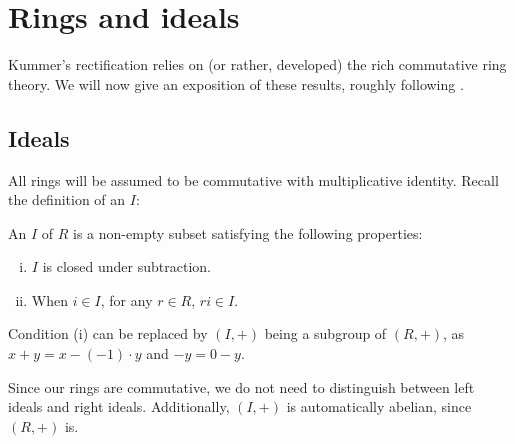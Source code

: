 \chapter{Rings and ideals}\label{sec-rings}
Kummer's rectification relies on (or rather, developed) the rich commutative ring theory. We will now give an exposition of these results, roughly following \cite{Wright}.
\section{Ideals}
All rings will be assumed to be commutative with multiplicative identity. Recall the definition of an  $I$:
\begin{definition}
An  $I$ of $R$ is a non-empty subset satisfying the following properties:
\begin{enumerate}[(i)]
    \item $I$ is closed under subtraction.
    \item When $i\in I$, for any $r\in R$, $ri\in I$.
\end{enumerate}
\end{definition}

\begin{remark}
Condition (i) can be replaced by $(I,+)$ being a subgroup of $(R,+)$, as $x+y=x-(-1)\cdot y$ and $-y=0-y$.
\end{remark}

\begin{remark}
Since our rings are commutative, we do not need to distinguish between left ideals and right ideals. Additionally, $(I,+)$ is automatically abelian, since $(R,+)$ is.
\end{remark}

